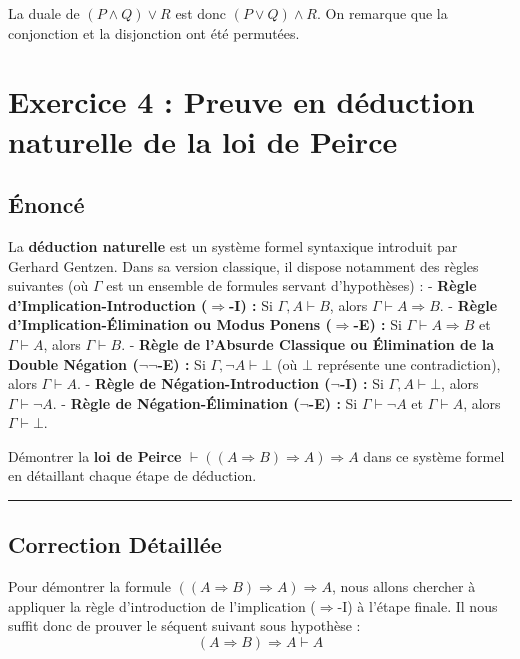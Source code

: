 \documentclass[11pt,a4paper]{article}
\begin{document}
La duale de \((P \land Q) \lor R\) est donc \((P \lor Q) \land R\). On
remarque que la conjonction et la disjonction ont été permutées.
\n
\hypertarget{exercice-4-preuve-en-duxe9duction-naturelle-de-la-loi-de-peirce}{%
\section{Exercice 4 : Preuve en déduction naturelle de la loi de
Peirce}\label{exercice-4-preuve-en-duxe9duction-naturelle-de-la-loi-de-peirce}}

\hypertarget{uxe9noncuxe9}{%
\subsection{Énoncé}\label{uxe9noncuxe9}}

La \textbf{déduction naturelle} est un système formel syntaxique
introduit par Gerhard Gentzen. Dans sa version classique, il dispose
notamment des règles suivantes (où \(\Gamma\) est un ensemble de
formules servant d'hypothèses) : - \textbf{Règle
d'Implication-Introduction (\(\Rightarrow\)-I) :} Si
\(\Gamma, A \vdash B\), alors \(\Gamma \vdash A \Rightarrow B\). -
\textbf{Règle d'Implication-Élimination ou Modus Ponens
(\(\Rightarrow\)-E) :} Si \(\Gamma \vdash A \Rightarrow B\) et
\(\Gamma \vdash A\), alors \(\Gamma \vdash B\). - \textbf{Règle de
l'Absurde Classique ou Élimination de la Double Négation
(\(\neg\neg\)-E) :} Si \(\Gamma, \neg A \vdash \bot\) (où \(\bot\)
représente une contradiction), alors \(\Gamma \vdash A\). -
\textbf{Règle de Négation-Introduction (\(\neg\)-I) :} Si
\(\Gamma, A \vdash \bot\), alors \(\Gamma \vdash \neg A\). -
\textbf{Règle de Négation-Élimination (\(\neg\)-E) :} Si
\(\Gamma \vdash \neg A\) et \(\Gamma \vdash A\), alors
\(\Gamma \vdash \bot\).

Démontrer la \textbf{loi de Peirce}
\(\vdash ((A \Rightarrow B) \Rightarrow A) \Rightarrow A\) dans ce
système formel en détaillant chaque étape de déduction.

\begin{center}\rule{0.5\linewidth}{0.5pt}\end{center}

\hypertarget{correction-duxe9tailluxe9e}{%
\subsection{Correction Détaillée}\label{correction-duxe9tailluxe9e}}

Pour démontrer la formule
\(((A \Rightarrow B) \Rightarrow A) \Rightarrow A\), nous allons
chercher à appliquer la règle d'introduction de l'implication
(\(\Rightarrow\)-I) à l'étape finale. Il nous suffit donc de prouver le
séquent suivant sous hypothèse :
\[(A \Rightarrow B) \Rightarrow A \vdash A\]
\end{document}

